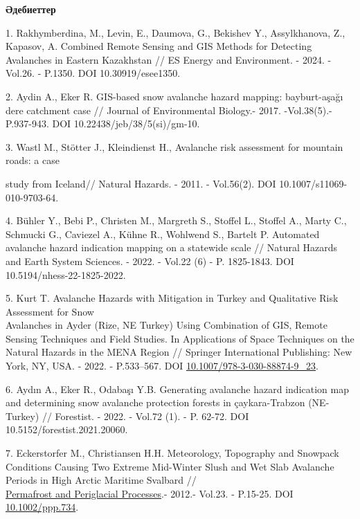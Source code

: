 \begin{center}
{\bfseries Әдебиеттер}
\end{center}

\begin{references}
1. Rakhymberdina, M., Levin, E., Daumova, G., Bekishev Y., Assylkhanova,
Z., Kapasov, A. Combined Remote Sensing and GIS Methods for Detecting
Avalanches in Eastern Kazakhstan // ES Energy and Environment. - 2024. -
Vol.26. - P.1350. DOI 10.30919/esee1350.

2. Aydin A., Eker R. GIS-based snow avalanche hazard mapping:
bayburt-aşağı dere catchment case // Journal of Environmental Biology.-
2017. -Vol.38(5).- P.937-943. DOI 10.22438/jeb/38/5(si)/gm-10.

3. Wastl M., Stötter J., Kleindienst H., Avalanche risk assessment for
mountain roads: a case

study from Iceland// Natural Hazards. - 2011. - Vol.56(2). DOI
10.1007/s11069-010-9703-64.

4. Bühler Y., Bebi P., Christen M., Margreth S., Stoffel L., Stoffel A.,
Marty C., Schmucki G., Caviezel A., Kühne R., Wohlwend S., Bartelt P.
Automated avalanche hazard indication mapping on a statewide scale //
Natural Hazards and Earth System Sciences. - 2022. - Vol.22 (6) - P.
1825-1843. DOI 10.5194/nhess-22-1825-2022.

5. Kurt T. Avalanche Hazards with Mitigation in Turkey and Qualitative
Risk Assessment for Snow \\Avalanches in Ayder (Rize, NE Turkey) Using
Combination of GIS, Remote Sensing Techniques and Field Studies. In
Applications of Space Techniques on the Natural Hazards in the MENA
Region // Springer International Publishing: New York, NY, USA. - 2022.
- P.533--567. DOI
\href{http://dx.doi.org/10.1007/978-3-030-88874-9_23}{10.1007/978-3-030-88874-9\_23}.

6. Aydın A., Eker R., Odabaşı Y.B. Generating avalanche hazard
indication map and determining snow avalanche protection forests in
çaykara-Trabzon (NE-Turkey) // Forestist. - 2022. - Vol.72 (1). - P.
62-72. DOI 10.5152/forestist.2021.20060.

7. Eckerstorfer M., Christiansen H.H. Meteorology, Topography and
Snowpack Conditions Causing Two Extreme Mid-Winter Slush and Wet Slab
Avalanche Periods in High Arctic Maritime Svalbard //\\
\href{https://www.researchgate.net/journal/Permafrost-and-Periglacial-Processes-1099-1530?_tp=eyJjb250ZXh0Ijp7ImZpcnN0UGFnZSI6InB1YmxpY2F0aW9uIiwicGFnZSI6InB1YmxpY2F0aW9uIn19}{Permafrost
and Periglacial Processes}.- 2012.- Vol.23. - P.15-25. DOI
\href{http://dx.doi.org/10.1002/ppp.734}{10.1002/ppp.734}.


\end{references}
